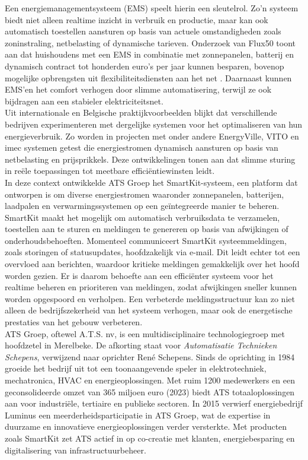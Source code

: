 Een energiemanagementsysteem (EMS) speelt hierin een sleutelrol. Zo’n systeem biedt niet alleen realtime inzicht in verbruik en productie, maar kan ook automatisch toestellen aansturen op basis van actuele omstandigheden zoals zoninstraling, netbelasting of dynamische tarieven. Onderzoek van Flux50 toont aan dat huishoudens met een EMS in combinatie met zonnepanelen, batterij en dynamisch contract tot honderden euro’s per jaar kunnen besparen, bovenop mogelijke opbrengsten uit flexibiliteitsdiensten aan het net \autocite{Rafique2017}. Daarnaast kunnen EMS'en het comfort verhogen door slimme automatisering, terwijl ze ook bijdragen aan een stabieler elektriciteitsnet.\\

Uit internationale en Belgische praktijkvoorbeelden blijkt dat verschillende bedrijven experimenteren met dergelijke systemen voor het optimaliseren van hun energieverbruik. Zo worden in projecten met onder andere EnergyVille, VITO en imec systemen getest die energiestromen dynamisch aansturen op basis van netbelasting en prijsprikkels. Deze ontwikkelingen tonen aan dat slimme sturing in reële toepassingen tot meetbare efficiëntiewinsten leidt.\\

In deze context ontwikkelde ATS Groep het SmartKit-systeem, een platform dat ontworpen is om diverse energiestromen waaronder zonnepanelen, batterijen, laadpalen en verwarmingssystemen op een geïntegreerde manier te beheren. SmartKit maakt het mogelijk om automatisch verbruiksdata te verzamelen, toestellen aan te sturen en meldingen te genereren op basis van afwijkingen of onderhoudsbehoeften. Momenteel communiceert SmartKit systeemmeldingen, zoals storingen of statusupdates, hoofdzakelijk via e-mail. Dit leidt echter tot een overvloed aan berichten, waardoor kritieke meldingen gemakkelijk over het hoofd worden gezien. Er is daarom behoefte aan een efficiënter systeem voor het realtime beheren en prioriteren van meldingen, zodat afwijkingen sneller kunnen worden opgespoord en verholpen. Een verbeterde meldingsstructuur kan zo niet alleen de bedrijfszekerheid van het systeem verhogen, maar ook de energetische prestaties van het gebouw verbeteren.\\

ATS Groep, oftewel A.T.S. nv, is een multidisciplinaire technologiegroep met hoofdzetel in Merelbeke. De afkorting staat voor \textit{Automatisatie Technieken Schepens}, verwijzend naar oprichter René Schepens. Sinds de oprichting in 1984 groeide het bedrijf uit tot een toonaangevende speler in elektrotechniek, mechatronica, HVAC en energieoplossingen. Met ruim 1200 medewerkers en een geconsolideerde omzet van 365 miljoen euro (2023) biedt ATS totaaloplossingen aan voor industriële, tertiaire en publieke sectoren. In 2015 verwierf energiebedrijf Luminus een meerderheidsparticipatie in ATS Groep, wat de expertise in duurzame en innovatieve energieoplossingen verder versterkte. Met producten zoals SmartKit zet ATS actief in op co-creatie met klanten, energiebesparing en digitalisering van infrastructuurbeheer.


